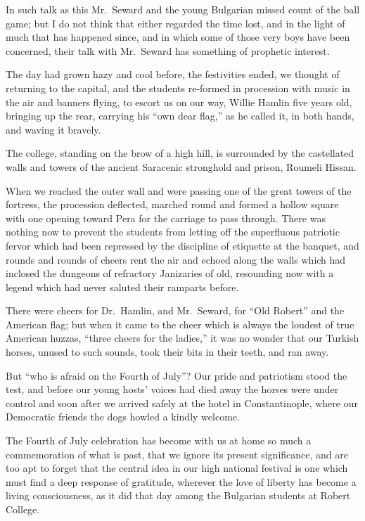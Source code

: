 \documentclass[12pt]{book}
\begin{document}
In such talk as this Mr.~Seward and the young Bulgarian missed count of the
ball game; but I do not think that either regarded the time lost, and in the light of
much that has happened since, and in which some of those very boys have been
concerned, their talk with Mr.~Seward has something of prophetic interest.

The day had grown hazy and cool before, the festivities ended, we thought of
returning to the capital, and the students re‐formed in procession with music in
the air and banners flying, to escort us on our way, Willie Hamlin five years old,
bringing up the rear, carrying his “own dear flag,” as he called it, in both hands,
and waving it bravely.

The college, standing on the brow of a high hill, is surrounded by the castellated
walls and towers of the ancient Saracenic stronghold and prison, Roumeli Hissan.

When we reached the outer wall and were passing one of the great towers
of the fortress, the procession deflected, marched round and formed a hollow
square with one opening toward Pera for the carriage to pass through. There was
nothing now to prevent the students from letting off the superfluous patriotic
fervor which had been repressed by the discipline of etiquette at the banquet,
and rounds and rounds of cheers rent the air and echoed along the walls which
had inclosed the dungeons of refractory Janizaries of old, resounding now with a
legend which had never saluted their ramparts before.

There were cheers for Dr.~Hamlin, and Mr.~Seward, for “Old Robert” and the
American flag; but when it came to the cheer which is always the loudest of true
American huzzas, “three cheers for the ladies,” it was no wonder that our Turkish
horses, unused to such sounds, took their bits in their teeth, and ran away.

But “who is afraid on the Fourth of July”? Our pride and patriotism stood the
test, and before our young hosts’ voices had died away the horses were under
control and soon after we arrived safely at the hotel in Constantinople, where
our Democratic friends the dogs howled a kindly welcome.

The Fourth of July celebration has become with us at home so much a commemoration of what is past, that we ignore its present significance, and are too
apt to forget that the central idea in our high national festival is one which must
find a deep response of gratitude, wherever the love of liberty has become a living
consciousness, as it did that day among the Bulgarian students at Robert College.
\end{document}
